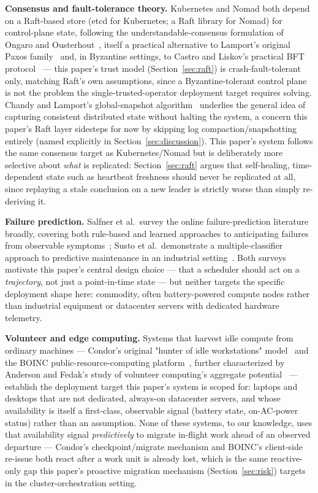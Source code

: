 \documentclass[conference]{IEEEtran}
\begin{document}
\textbf{Consensus and fault-tolerance theory.} Kubernetes and Nomad both depend on a Raft-based store
(etcd for Kubernetes; a Raft library for Nomad) for control-plane state, following the
understandable-consensus formulation of Ongaro and Ousterhout~\cite{ongaro2014raft}, itself a
practical alternative to Lamport's original Paxos family~\cite{lamport1998part} and, in Byzantine
settings, to Castro and Liskov's practical BFT protocol~\cite{castro1999pbft} — this paper's trust
model (Section~\ref{sec:raft}) is crash-fault-tolerant only, matching Raft's own assumptions, since a
Byzantine-tolerant control plane is not the problem the single-trusted-operator deployment target
requires solving. Chandy and Lamport's global-snapshot algorithm~\cite{chandy1985snapshots}
underlies the general idea of capturing consistent distributed state without halting the system, a
concern this paper's Raft layer sidesteps for now by skipping log compaction/snapshotting entirely
(named explicitly in Section~\ref{sec:discussion}). This paper's system follows the same consensus
target as Kubernetes/Nomad but is deliberately more selective about \emph{what} is replicated:
Section~\ref{sec:raft} argues that self-healing, time-dependent state such as heartbeat freshness
should never be replicated at all, since replaying a stale conclusion on a new leader is strictly
worse than simply re-deriving it.

\textbf{Failure prediction.} Salfner et al.\ survey the online failure-prediction literature broadly,
covering both rule-based and learned approaches to anticipating failures from
observable symptoms~\cite{salfner2010survey}; Susto et al.\ demonstrate a multiple-classifier approach
to predictive maintenance in an industrial setting~\cite{susto2015machine}. Both surveys motivate this
paper's central design choice — that a scheduler should act on a \emph{trajectory}, not just a
point-in-time state — but neither targets the specific deployment shape here: commodity,
often battery-powered compute nodes rather than industrial equipment or datacenter servers with
dedicated hardware telemetry.

\textbf{Volunteer and edge computing.} Systems that harvest idle compute from ordinary machines —
Condor's original "hunter of idle workstations" model~\cite{litzkow1988condor} and the
BOINC public-resource-computing platform~\cite{anderson2004boinc}, further characterized by
Anderson and Fedak's study of volunteer computing's aggregate potential~\cite{anderson2006volunteer} —
establish the deployment target this paper's system is scoped for: laptops and desktops that are not
dedicated, always-on datacenter servers, and whose availability is itself a first-class, observable
signal (battery state, on-AC-power status) rather than an assumption. None of these systems, to our
knowledge, uses that availability signal \emph{predictively} to migrate in-flight work ahead of an
observed departure — Condor's checkpoint/migrate mechanism and BOINC's client-side re-issue both react
after a work unit is already lost, which is the same reactive-only gap this paper's proactive
migration mechanism (Section~\ref{sec:risk}) targets in the cluster-orchestration setting.
\end{document}
